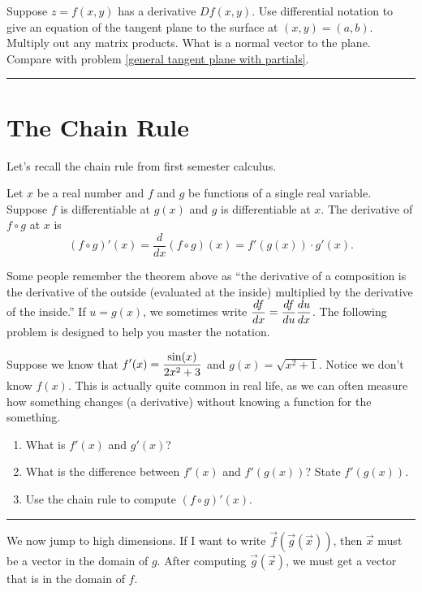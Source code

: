 \begin{problem}
  Suppose $z=f(x,y)$ has a derivative $Df(x,y)$. Use differential notation to give an equation of the tangent plane to the surface at $(x,y)=(a,b)$. Multiply out any matrix products. What is a normal vector to the plane. Compare with problem \ref{general tangent plane with partials}.
\hrule\end{problem}

\section{The Chain Rule}

Let's recall the chain rule from first semester calculus. 

\begin{theorem}
 Let $x$ be a real number and $f$ and $g$ be functions of a single real variable. Suppose $f$ is differentiable at $g(x)$ and $g$ is differentiable at $x$. The derivative of $f\circ g$ at $x$ is 
$$(f\circ g)'(x) = \frac{d}{dx}(f\circ g)(x) = f'(g(x))\cdot g'(x).$$
\end{theorem}

Some people remember the theorem above as ``the derivative of a composition is the derivative of the outside (evaluated at the inside) multiplied by the derivative of the inside.'' If $u=g(x)$, we sometimes write $\displaystyle \frac{df}{dx}=\frac{df}{du}\frac{du}{dx}$. The following problem is designed to help you master the notation.

\begin{problem}\label{chain rule review problem}
 Suppose we know that $\displaystyle f'(x) = \frac{\sin(x)}{2x^2+3}$ and $g(x)=\sqrt{x^2+1}$. Notice we don't know $f(x)$.  This is actually quite common in real life, as we can often measure how something changes (a derivative) without knowing a function for the something.
\begin{enumerate}
 \item What is $f'(x)$ and $g'(x)$?
 \item What is the difference between $f'(x)$ and $f'(g(x))$? State $f'(g(x))$.
 \item Use the chain rule to compute $(f\circ g)'(x)$.
\end{enumerate}
\hrule\end{problem}

We now jump to high dimensions. If I want to write $\vec f(\vec g(\vec x))$, then $\vec x$ must be a vector in the domain of $g$.  After computing $\vec g(\vec x)$, we must get a vector that is in the domain of $f$. 

